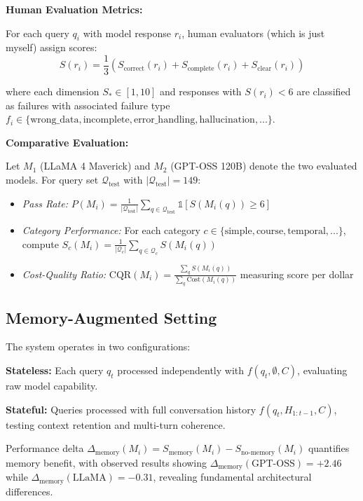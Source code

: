 \documentclass{article}
\begin{document}
\textbf{Human Evaluation Metrics:}

For each query $q_i$ with model response $r_i$, human evaluators (which is just myself) assign scores:
\begin{equation}
S(r_i) = \frac{1}{3}(S_{\text{correct}}(r_i) + S_{\text{complete}}(r_i) + S_{\text{clear}}(r_i))
\end{equation}

where each dimension $S_* \in [1, 10]$ and responses with $S(r_i) < 6$ are classified as failures with associated failure type $f_i \in \{\text{wrong\_data}, \text{incomplete}, \text{error\_handling}, \text{hallucination}, ...\}$.

\textbf{Comparative Evaluation:}

Let $M_1$ (LLaMA 4 Maverick) and $M_2$ (GPT-OSS 120B) denote the two evaluated models. For query set $\mathcal{Q}_{\text{test}}$ with $|\mathcal{Q}_{\text{test}}| = 149$:

\begin{itemize}
\item \textit{Pass Rate:} $P(M_i) = \frac{1}{|\mathcal{Q}_{\text{test}}|} \sum_{q \in \mathcal{Q}_{\text{test}}} \mathbb{1}[S(M_i(q)) \geq 6]$
\item \textit{Category Performance:} For each category $c \in \{\text{simple}, \text{course}, \text{temporal}, ...\}$, compute $S_c(M_i) = \frac{1}{|\mathcal{Q}_c|} \sum_{q \in \mathcal{Q}_c} S(M_i(q))$
\item \textit{Cost-Quality Ratio:} $\text{CQR}(M_i) = \frac{\sum_{q} S(M_i(q))}{\sum_{q} \text{Cost}(M_i(q))}$ measuring score per dollar
\end{itemize}

\subsection{Memory-Augmented Setting}

The system operates in two configurations:

\textbf{Stateless:} Each query $q_t$ processed independently with $f(q_t, \emptyset, C)$, evaluating raw model capability.

\textbf{Stateful:} Queries processed with full conversation history $f(q_t, H_{1:t-1}, C)$, testing context retention and multi-turn coherence.

Performance delta $\Delta_{\text{memory}}(M_i) = S_{\text{memory}}(M_i) - S_{\text{no-memory}}(M_i)$ quantifies memory benefit, with observed results showing $\Delta_{\text{memory}}(\text{GPT-OSS}) = +2.46$ while $\Delta_{\text{memory}}(\text{LLaMA}) = -0.31$, revealing fundamental architectural differences.
\end{document}
